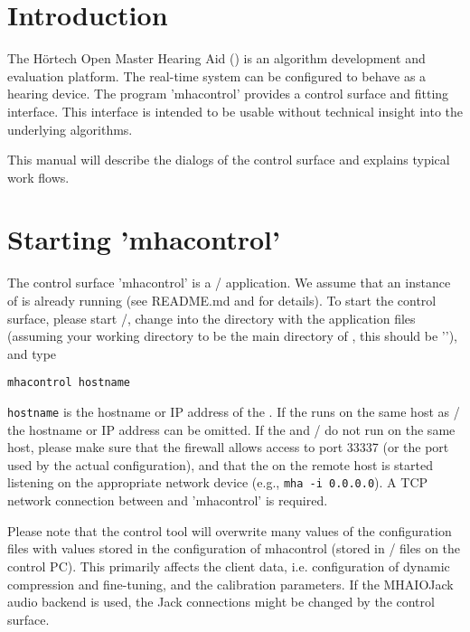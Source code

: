 \documentclass[11pt,a4paper,twoside]{article}
\newcommand{\+}{\discretionary{\mbox{\scriptsize$\hookleftarrow$}}{}{}}
\begin{document}
\newpage
\MHAcopyright{}
\newpage
\tableofcontents
\newpage
\renewcommand{\leftmark}{\rightmark}


\section{Introduction}

The H\"{o}rtech Open Master Hearing Aid (\mha{}) is an algorithm 
development and evaluation platform.
%
The real-time system can be configured to behave as a hearing device.
%
The program 'mhacontrol' provides a control surface and fitting
interface.
%
This interface is intended to be usable without technical insight into
the underlying algorithms.

This manual will describe the dialogs of the control surface and
explains typical work flows.

\section{Starting 'mhacontrol'}

The control surface 'mhacontrol' is a \Octave{}/\Matlab{}
application.
%
We assume that an instance of \mha{} is already running (see README.md and \EngineerManual{} for 
details). To start the control surface, please start \Octave{}/\Matlab{}, change into the 
directory with the application files (assuming your working directory to be the 
main directory of \mha{}, this should be '\MatlabDir{}'), and type
%
\begin{verbatim}
mhacontrol hostname
\end{verbatim}
%
\verb!hostname! is the hostname or IP address of the \mha{}.
%
If the \mha{} runs on the same host as \Octave{}/\Matlab{} the hostname or IP address
can be omitted.
%
If the \mha{} and \Octave{}/\Matlab{} do not run on the same host, please make sure
that the firewall allows access to port
33337 (or the port used by the actual \mha{} configuration), and that the
\mha{} on the remote host is started listening on the appropriate network
device (e.g., \verb!mha -i 0.0.0.0!).
%
A TCP network connection between \mha{} and 'mhacontrol' is required.

Please note that the control tool will overwrite many values of the
\mha{} configuration files with values stored in the configuration of
mhacontrol (stored in \Octave{}/\Matlab{} files on the control PC).
%
This primarily affects the client data, i.e. configuration of dynamic
compression and fine-tuning, and the calibration parameters.
%
If the MHAIOJack audio backend is used, the Jack connections might be
changed by the control surface.
\end{document}
